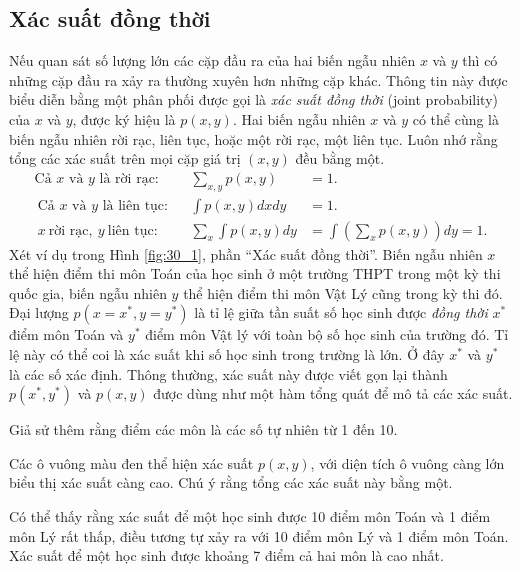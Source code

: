 \subsection{Xác suất đồng thời}
Nếu quan sát số lượng lớn các cặp đầu ra của hai biến ngẫu nhiên $x$ và $y$ thì
có những cặp đầu ra xảy ra thường xuyên hơn những cặp khác. Thông tin này được
biểu diễn bằng một phân phối được gọi là \textit{xác suất đồng thời} (joint probability) của $x$ và
$y$, được ký hiệu là $p(x, y)$. Hai biến ngẫu nhiên $x$ và $y$ có thể cùng là
biến ngẫu nhiên rời rạc, liên tục, hoặc một rời rạc, một liên tục. Luôn nhớ rằng
tổng các xác suất trên mọi cặp giá trị $(x, y)$ đều bằng một.
\begin{align}
\text{Cả $x$ và $y$ là rời rạc:}  & &\sum_{x, y} p(x, y) &= 1. \\\
\text{Cả $x$ và $y$ là liên tục:} & &\int p(x, y) dx dy &=1.\\\
x ~\text{rời rạc}, ~ y ~\text{liên tục:} & &\sum_{x} \int p(x, y) dy &= \int \left(\sum_{x} p(x, y) \right)dy = 1.
\end{align}
Xét ví dụ trong Hình \ref{fig:30_1}, phần ``Xác suất đồng thời''. Biến ngẫu nhiên
$x$ thể hiện điểm thi môn Toán của học sinh ở một trường THPT trong một kỳ thi
quốc gia, biến ngẫu nhiên $y$ thể hiện điểm thi môn Vật Lý cũng trong kỳ thi đó.
Đại lượng $p(x = x^*, y = y^*)$ là tỉ lệ giữa tần suất số học sinh được
\textit{đồng thời} $x^*$ điểm môn Toán và $y^*$ điểm môn Vật lý với
toàn bộ số học sinh của trường đó. Tỉ lệ này có thể coi là xác suất khi số học
sinh trong trường là lớn. Ở đây $x^*$ và $y^*$ là các số xác định. Thông thường,
xác suất này được viết gọn lại thành $p(x^*, y^*)$ và $p(x, y)$ được dùng như
một hàm tổng quát để mô tả các xác suất.

Giả sử thêm rằng điểm các môn là các số tự nhiên từ 1 đến 10.

Các ô vuông màu đen thể hiện xác suất $p(x, y)$, với diện tích ô vuông càng lớn
biểu thị xác suất càng cao. Chú ý rằng tổng các xác suất này bằng một.

{Có thể thấy rằng xác suất để một học sinh được 10 điểm môn Toán
và 1 điểm môn Lý rất thấp, điều tương tự xảy ra với 10 điểm môn Lý và 1 điểm môn
Toán. Xác suất để một học sinh được khoảng 7 điểm cả hai môn là cao
nhất.}

